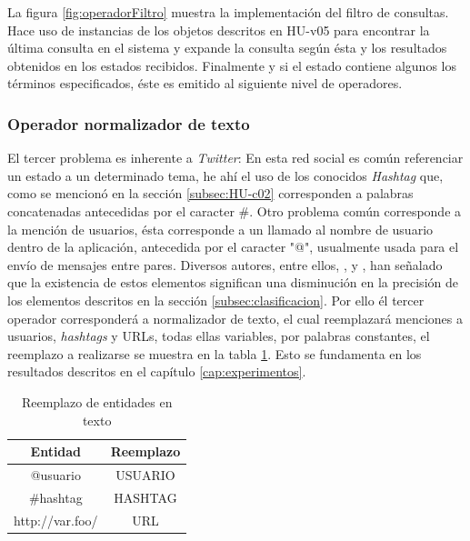 La figura \ref{fig:operadorFiltro} muestra la implementación del filtro de consultas. Hace uso de instancias de los objetos descritos en HU-v05 para encontrar la última consulta en el sistema y expande la consulta según ésta y los resultados obtenidos en los estados recibidos. Finalmente y si el estado contiene algunos los términos especificados, éste es emitido al siguiente nivel de operadores.

\subsubsection{Operador normalizador de texto}
\label{subsubsec:3op}

El tercer problema es inherente a \textit{Twitter}: En esta red social es común referenciar un estado a un determinado tema, he ahí el uso de los conocidos \textit{Hashtag} que, como se mencionó en la sección \ref{subsec:HU-c02} corresponden a palabras concatenadas antecedidas por el caracter \#. Otro problema común corresponde a la mención de usuarios, ésta corresponde a un llamado al nombre de usuario dentro de la aplicación, antecedida por el caracter "@", usualmente usada para el envío de mensajes entre pares. Diversos autores, entre ellos, \cite{NLPaccuracy}, \cite{NLPaccuracy1} y \cite{NLPaccuracy2}, han señalado que la existencia de estos elementos significan una disminución en la precisión de los elementos descritos en la sección \ref{subsec:clasificacion}. Por ello él tercer operador corresponderá a normalizador de texto, el cual reemplazará menciones a usuarios, \textit{hashtags} y URLs, todas ellas variables, por palabras constantes, el reemplazo a realizarse se muestra en la tabla \ref{tab:reemplazosDeEntidades}. Esto se fundamenta en los resultados descritos en el capítulo \ref{cap:experimentos}.\\

\begin{table}[H]
\centering
\caption{Reemplazo de entidades en texto}
\label{tab:reemplazosDeEntidades}
\begin{tabular}{|c|c|}
\hline
\textbf{Entidad} & \textbf{Reemplazo} \\ \hline
@usuario         & USUARIO            \\ \hline
\#hashtag        & HASHTAG            \\ \hline
http://var.foo/  & URL                \\ \hline
\end{tabular}
\end{table}

